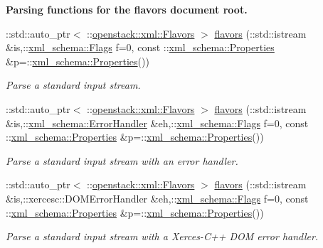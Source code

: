 \begin{Indent}{\bf Parsing functions for the flavors document root.}
\begin{DoxyCompactItemize}
::std::auto\_\-ptr$<$ ::\hyperlink{classopenstack_1_1xml_1_1Flavors}{openstack::xml::Flavors} $>$ \hyperlink{namespaceopenstack_1_1xml_aff75565f9042c25803fda08b57ca3b6b}{flavors} (::std::istream \&is,::\hyperlink{namespacexml__schema_affb4c227cbd9aa7453dd1dc5a1401943}{xml\_\-schema::Flags} f=0, const ::\hyperlink{namespacexml__schema_ad27ce19a7ee1d3b1064092648898f64c}{xml\_\-schema::Properties} \&p=::\hyperlink{namespacexml__schema_ad27ce19a7ee1d3b1064092648898f64c}{xml\_\-schema::Properties}())
\begin{DoxyCompactList}\small\item\em Parse a standard input stream. \item\end{DoxyCompactList}\item 
::std::auto\_\-ptr$<$ ::\hyperlink{classopenstack_1_1xml_1_1Flavors}{openstack::xml::Flavors} $>$ \hyperlink{namespaceopenstack_1_1xml_a918a61d3464115ef40b2fbcb64dd1235}{flavors} (::std::istream \&is,::\hyperlink{namespacexml__schema_ab1c9361bfd3b404eaabf0c31eded79dc}{xml\_\-schema::ErrorHandler} \&eh,::\hyperlink{namespacexml__schema_affb4c227cbd9aa7453dd1dc5a1401943}{xml\_\-schema::Flags} f=0, const ::\hyperlink{namespacexml__schema_ad27ce19a7ee1d3b1064092648898f64c}{xml\_\-schema::Properties} \&p=::\hyperlink{namespacexml__schema_ad27ce19a7ee1d3b1064092648898f64c}{xml\_\-schema::Properties}())
\begin{DoxyCompactList}\small\item\em Parse a standard input stream with an error handler. \item\end{DoxyCompactList}\item 
::std::auto\_\-ptr$<$ ::\hyperlink{classopenstack_1_1xml_1_1Flavors}{openstack::xml::Flavors} $>$ \hyperlink{namespaceopenstack_1_1xml_ac51e2bd2dd97b7937bd35390eaf45c0e}{flavors} (::std::istream \&is,::xercesc::DOMErrorHandler \&eh,::\hyperlink{namespacexml__schema_affb4c227cbd9aa7453dd1dc5a1401943}{xml\_\-schema::Flags} f=0, const ::\hyperlink{namespacexml__schema_ad27ce19a7ee1d3b1064092648898f64c}{xml\_\-schema::Properties} \&p=::\hyperlink{namespacexml__schema_ad27ce19a7ee1d3b1064092648898f64c}{xml\_\-schema::Properties}())
\begin{DoxyCompactList}\small\item\em Parse a standard input stream with a Xerces-\/C++ DOM error handler. \item\end{DoxyCompactList}\item 

\end{DoxyCompactItemize}
\end{Indent}
